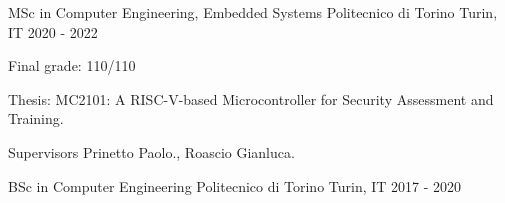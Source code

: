 

\begin{cventries}

  \cventry
    {MSc in Computer Engineering, Embedded Systems} %
    {Politecnico di Torino} %
    {Turin, IT} %
    {2020 - 2022} %
    {
      \begin{cvitems} %
        \item {Final grade: 110/110}
        \item {Thesis: MC2101: A RISC-V-based Microcontroller for Security Assessment and Training.} 
        \item {Supervisors Prinetto Paolo., Roascio Gianluca.}
      \end{cvitems}
    }
    
  \cventry
    {BSc in Computer Engineering} %
    {Politecnico di Torino} %
    {Turin, IT} %
    {2017 - 2020} %
    {
      \begin{cvitems} %
      \end{cvitems}
    }
    
\end{cventries}
